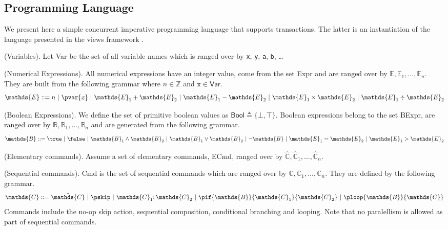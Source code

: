 \subsection{Programming Language}
\label{language}

We present here a simple concurrent imperative programming language that supports transactions. The latter is an instantiation of the language presented in the views framework \cite{views}.

\begin{defn}
	(Variables).
	Let \textsf{Var} be the set of all variable names which is ranged over by \texttt{x}, \texttt{y}, \texttt{a}, \texttt{b}, \ldots
\end{defn}

\begin{defn}
	(Numerical Expressions).
	All numerical expressions have an integer value, come from the set \textsf{Expr} and are ranged over by $\mathds{E}, \mathds{E}_1, \ldots, \mathds{E}_n$. They are built from the following grammar where $n \in \mathds{Z}$ and $\mathtt{x} \in \mathsf{Var}$.
	\[
		\mathds{E} ::=
			n\
			|\ \pvar{x}\
			|\ \mathds{E}_1 + \mathds{E}_2\
			|\ \mathds{E}_1 - \mathds{E}_2\
			|\ \mathds{E}_1 \times \mathds{E}_2\
			|\ \mathds{E}_1 \div \mathds{E}_2
	\]
\end{defn}

\begin{defn}
	(Boolean Expressions).
	We define the set of primitive boolean values as $\mathsf{Bool} \triangleq \{ \bot, \top \}$. Boolean expressions belong to the set \textsf{BExpr}, are ranged over by $\mathds{B}, \mathds{B}_1, \ldots, \mathds{B}_n$ and are generated from the following grammar.
	\[
		\mathds{B} ::=
			\true\
			|\ \false\
			|\ \mathds{B}_1 \land \mathds{B}_2\
			|\ \mathds{B}_1 \lor \mathds{B}_2\
			|\ \lnot \mathds{B}\
			|\ \mathds{E}_1 = \mathds{E}_2\
			|\ \mathds{E}_1 > \mathds{E}_2
	\]
\end{defn}

\begin{param}
	(Elementary commands).
	Assume a set of elementary commands, \textsf{ECmd}, ranged over by $\hat{\mathds{C}}, \hat{\mathds{C}}_1, \ldots, \hat{\mathds{C}}_n$.
\end{param}

\begin{defn}
	(Sequential commands).
	\textsf{Cmd} is the set of sequential commands which are ranged over by $\mathds{C}, \mathds{C}_1, \ldots, \mathds{C}_n$. They are defined by the following grammar.
	\[
		\mathds{C} ::=
			\hat{\mathds{C}}\
			|\ \pskip\
			|\ \mathds{C}_1; \mathds{C}_2\
			|\ \pif{\mathds{B}}{\mathds{C}_1}{\mathds{C}_2}\
			|\ \ploop{\mathds{B}}{\mathds{C}}
	\]
	Commands include the no-op skip action, sequential composition, conditional branching and looping. Note that no paralellism is allowed as part of sequential commands.
\end{defn}

